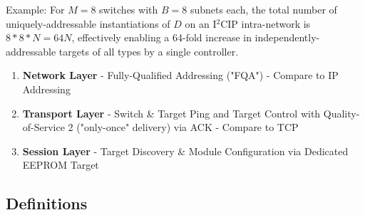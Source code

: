 \documentclass{../tex/report}
\begin{document}
Example: For $M = 8$ switches with $B = 8$ subnets each, the total number of uniquely-addressable instantiations of $D$ on an I${}^2$CIP intra-network is $8 * 8 * N = 64N$, effectively enabling a 64-fold increase in independently-addressable targets of all types by a single controller.


\begin{enumerate}[label=SC\arabic*., ref=SC\arabic*, resume]
    \item\label{sc:3} \textbf{Network Layer} - Fully-Qualified Addressing ("FQA") - Compare to IP Addressing
    \item\label{sc:4} \textbf{Transport Layer} - Switch \& Target Ping and Target Control with Quality-of-Service 2 ("only-once" delivery) via ACK - Compare to TCP
    \item\label{sc:5} \textbf{Session Layer} - Target Discovery \& Module Configuration via Dedicated EEPROM Target
\end{enumerate}






\subsection{Definitions}\label{sec:definitions}
\end{document}
